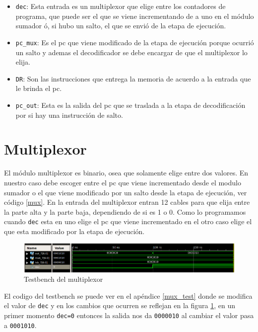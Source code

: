 \begin{itemize}
	\item \texttt{dec}: Esta entrada es un multiplexor que elige entre los contadores de programa, que puede ser el que se viene incrementando de a uno en el módulo sumador \'o, si hubo un salto, el que se envió de la etapa de ejecución. 
	\item \texttt{pc\_mux}: Es el  \ac{pc} que viene modificado de la etapa de ejecución porque ocurrió un salto y ademas el decodificador se debe encargar de que el multiplexor lo elija.	
	\item \texttt{DR}: Son las instrucciones que entrega la memoria de acuerdo a la entrada que le brinda el \ac{pc}. 
	\item \texttt{pc\_out}: Esta es la salida del \ac{pc} que se traslada a la etapa de decodificación por si hay una instrucción de salto. 	
\end{itemize}

\section{Multiplexor}

El módulo multiplexor es binario, osea que solamente elige entre dos valores. En nuestro caso debe escoger entre el \ac{pc} que viene incrementado desde el modulo sumador o el que viene modificado por un salto desde la etapa de ejecución, ver código \ref{mux}. En la entrada del multiplexor entran 12 cables para que elija entre la parte alta y la parte baja, dependiendo de si es 1 o 0. Como lo programamos cuando \texttt{dec} esta en uno elige el \ac{pc}  que viene incrementado en el otro caso elige el que esta modificado por la etapa de ejecución.

\begin{figure}[H]
\centering
\includegraphics[scale=0.4]{Capitulo01/mux_test}
\caption{Testbench del multiplexor}
\label{fig:muxt}
\end{figure}

El codigo del testbench se puede ver en el apéndice \ref{mux_test} donde se modifica el valor de \texttt{dec} y en los cambios que ocurren se reflejan en la figura \ref{fig:muxt}, en un primer momento \texttt{dec=0} entonces la salida nos da \texttt{0000010} al cambiar el valor pasa a \texttt{0001010}.

